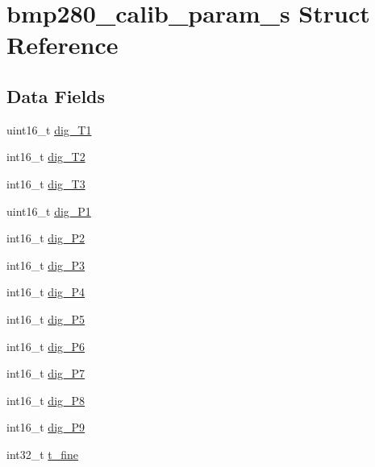 \hypertarget{structbmp280__calib__param__s}{\section{bmp280\+\_\+calib\+\_\+param\+\_\+s Struct Reference}
\label{structbmp280__calib__param__s}
}
\subsection*{Data Fields}
\begin{DoxyCompactItemize}
\item 
uint16\+\_\+t \hyperlink{structbmp280__calib__param__s_a50095510dc3ed05650e1daefe992cb53}{dig\+\_\+\+T1}
\item 
int16\+\_\+t \hyperlink{structbmp280__calib__param__s_a9725ff5c2473b57038d9ae2857edeb91}{dig\+\_\+\+T2}
\item 
int16\+\_\+t \hyperlink{structbmp280__calib__param__s_ad658ffb1b81849c29a98b53ea78a187a}{dig\+\_\+\+T3}
\item 
uint16\+\_\+t \hyperlink{structbmp280__calib__param__s_ad3994d7aeb56a58b54e3862f1dbaf634}{dig\+\_\+\+P1}
\item 
int16\+\_\+t \hyperlink{structbmp280__calib__param__s_af80bcd490648eda7bda61758148ef4d9}{dig\+\_\+\+P2}
\item 
int16\+\_\+t \hyperlink{structbmp280__calib__param__s_aaf80164ee58ea570f9a74872630e803a}{dig\+\_\+\+P3}
\item 
int16\+\_\+t \hyperlink{structbmp280__calib__param__s_ae5d1e7049cd2eadf0de6a5348a78d5bc}{dig\+\_\+\+P4}
\item 
int16\+\_\+t \hyperlink{structbmp280__calib__param__s_aabefefd9a5da544f58f11f88d1b52927}{dig\+\_\+\+P5}
\item 
int16\+\_\+t \hyperlink{structbmp280__calib__param__s_aadffdd1bd7387e9d3abff436bff6d85a}{dig\+\_\+\+P6}
\item 
int16\+\_\+t \hyperlink{structbmp280__calib__param__s_acf9070f7b3bd6fbfaa53a832e297317d}{dig\+\_\+\+P7}
\item 
int16\+\_\+t \hyperlink{structbmp280__calib__param__s_a42992c3b9626bdd5ba4feae172dc16b0}{dig\+\_\+\+P8}
\item 
int16\+\_\+t \hyperlink{structbmp280__calib__param__s_a28a354142f5e118cb158d125d1bb2fb4}{dig\+\_\+\+P9}
\item 
int32\+\_\+t \hyperlink{structbmp280__calib__param__s_aca4c582df947eeb34ff9dfbe41e8e258}{t\+\_\+fine}
\end{DoxyCompactItemize}


